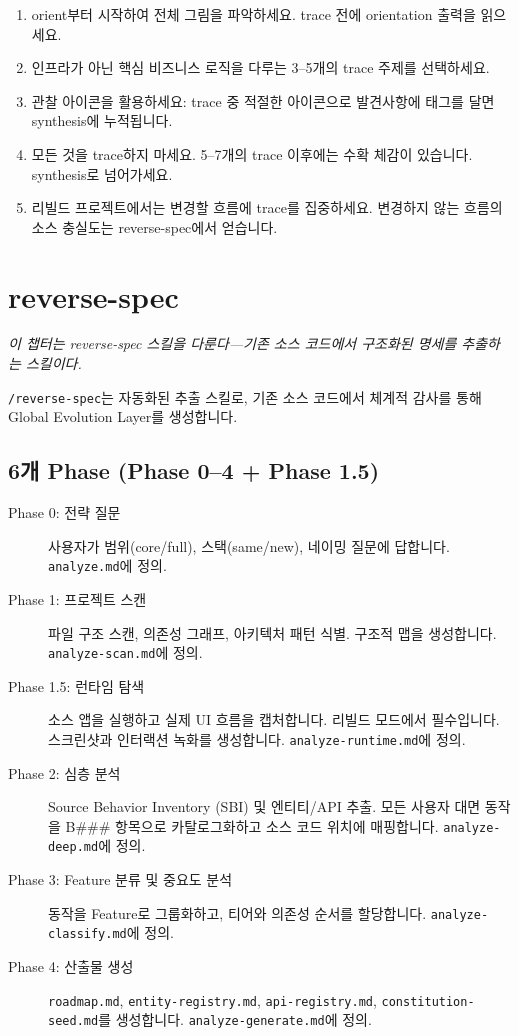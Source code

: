 \documentclass[11pt,a4paper,openright,twoside]{report}
\newcommand{\cmd}[1]{\texttt{/#1}}
\newcommand{\file}[1]{\texttt{#1}}
\begin{document}
\begin{tipbox}[탐색 모범 사례]
\begin{enumerate}
  \item orient부터 시작하여 전체 그림을 파악하세요. trace 전에 orientation 출력을 읽으세요.
  \item 인프라가 아닌 핵심 비즈니스 로직을 다루는 3--5개의 trace 주제를 선택하세요.
  \item 관찰 아이콘을 활용하세요: trace 중 적절한 아이콘으로 발견사항에 태그를 달면 synthesis에 누적됩니다.
  \item 모든 것을 trace하지 마세요. 5--7개의 trace 이후에는 수확 체감이 있습니다. synthesis로 넘어가세요.
  \item 리빌드 프로젝트에서는 변경할 흐름에 trace를 집중하세요. 변경하지 않는 흐름의 소스 충실도는 reverse-spec에서 얻습니다.
\end{enumerate}
\end{tipbox}


\chapter{reverse-spec}
\label{ch:reverse-spec}

\textit{이 챕터는 reverse-spec 스킬을 다룬다---기존 소스 코드에서 구조화된 명세를 추출하는 스킬이다.}

\cmd{reverse-spec}는 자동화된 추출 스킬로, 기존 소스 코드에서 체계적 감사를 통해 Global Evolution Layer를 생성합니다.

\section{6개 Phase (Phase 0--4 + Phase 1.5)}

\begin{description}
  \item[Phase 0: 전략 질문] 사용자가 범위(core/full), 스택(same/new), 네이밍 질문에 답합니다. \file{analyze.md}에 정의.
  \item[Phase 1: 프로젝트 스캔] 파일 구조 스캔, 의존성 그래프, 아키텍처 패턴 식별. 구조적 맵을 생성합니다. \file{analyze-scan.md}에 정의.
  \item[Phase 1.5: 런타임 탐색] 소스 앱을 실행하고 실제 UI 흐름을 캡처합니다. 리빌드 모드에서 필수입니다. 스크린샷과 인터랙션 녹화를 생성합니다. \file{analyze-runtime.md}에 정의.
  \item[Phase 2: 심층 분석] Source Behavior Inventory (SBI) 및 엔티티/API 추출. 모든 사용자 대면 동작을 B\#\#\# 항목으로 카탈로그화하고 소스 코드 위치에 매핑합니다. \file{analyze-deep.md}에 정의.
  \item[Phase 3: Feature 분류 및 중요도 분석] 동작을 Feature로 그룹화하고, 티어와 의존성 순서를 할당합니다. \file{analyze-classify.md}에 정의.
  \item[Phase 4: 산출물 생성] \file{roadmap.md}, \file{entity-registry.md}, \file{api-registry.md}, \file{constitution-seed.md}를 생성합니다. \file{analyze-generate.md}에 정의.
\end{description}
\end{document}
